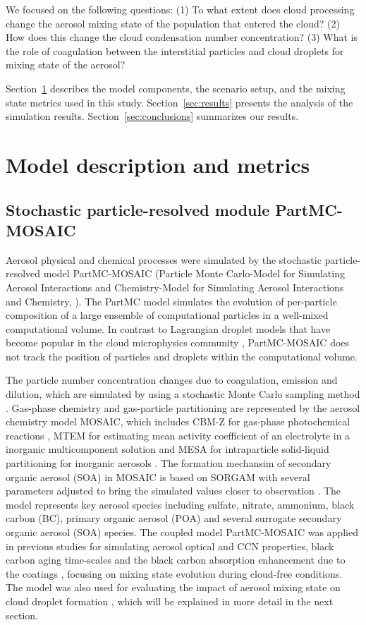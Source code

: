 \documentclass[edeposit,fullpage]{uiucthesis2009}
\begin{document}
We focused on the following questions: (1) To what extent does cloud
processing change the aerosol mixing state of the population that
entered the cloud? (2) How does this change the cloud condensation
number concentration? (3) What is the role of coagulation between the
interstitial particles and cloud droplets for mixing state of the
aerosol?

Section~\ref{sec:model} describes the model components, the scenario
setup, and the mixing state metrics used in this
study. Section~\ref{sec:results} presents the analysis of the
simulation results. Section~\ref{sec:conclusions} summarizes our
results.
%

\section{Model description and metrics}
\label{sec:model}
\subsection{Stochastic particle-resolved module PartMC-MOSAIC}
Aerosol physical and chemical processes were simulated by the
stochastic particle-resolved model PartMC-MOSAIC (Particle Monte
Carlo-Model for Simulating Aerosol Interactions and Chemistry-Model
for Simulating Aerosol Interactions and Chemistry, \citep{Riemer2009,
  Zaveri2008}). The PartMC model simulates the evolution of
per-particle composition of a large ensemble of computational
particles in a well-mixed computational volume. In contrast to
Lagrangian droplet models that have become popular in the cloud
microphysics community \citep{Shima2009,Grabowski2019}, PartMC-MOSAIC 
does not track the position of particles and droplets within the computational
volume.

The particle number concentration changes due to coagulation, emission
and dilution, which are simulated by using a stochastic Monte Carlo
sampling method \citep{Riemer2009}. Gas-phase chemistry and
gas-particle partitioning are represented by the aerosol chemistry
model MOSAIC, which includes CBM-Z for gas-phase photochemical
reactions \citep{Zaveri1999}, MTEM for estimating mean activity
coefficient of an electrolyte in a inorganic multicomponent solution
\citep{Zaveri2005} and MESA for intraparticle solid-liquid
partitioning for inorganic aerosols \citep{Zaveri2005a}. The formation
mechansim of secondary organic aerosol (SOA) in MOSAIC is based on
SORGAM \citep{Schell2001} with several parameters adjusted to bring the
simulated values closer to observation \citep{Zaveri2010a}. The model
represents key aerosol species including sulfate, nitrate, ammonium,
black carbon (BC), primary organic aerosol (POA) and several surrogate
secondary organic aerosol (SOA) species. The coupled model
PartMC-MOSAIC was applied in previous studies for simulating aerosol
optical and CCN properties, black carbon aging time-scales and the
black carbon absorption enhancement due to the coatings
\citep{Zaveri2010a, Riemer2010, Fierce2017,Fierce2020}, focusing on
mixing state evolution during cloud-free conditions. The model was
also used for evaluating the impact of aerosol mixing state on cloud
droplet formation \citep{ching2012impacts,Ching2016}, which will be explained
in more detail in the next section.
\end{document}
